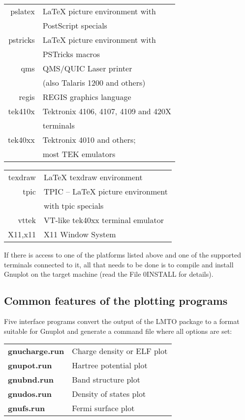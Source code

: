 \documentclass[aps,twocolumn,a4]{revtex4}
\begin{document}
\begin{tabular}{r l}
          pslatex & LaTeX picture environment with \\
                  & PostScript specials\\
         pstricks & LaTeX picture environment with \\
                  & PSTricks macros\\
              qms & QMS/QUIC Laser printer \\
                  & (also Talaris 1200 and others)\\
            regis & REGIS graphics language\\
          tek410x & Tektronix 4106, 4107, 4109 and 420X \\
                  & terminals\\
          tek40xx & Tektronix 4010 and others; \\
                  & most TEK emulators\\
\end{tabular}
\begin{tabular}{r l}
          texdraw & LaTeX texdraw environment\\
             tpic & TPIC -- LaTeX picture environment \\
                  & with tpic specials\\
            vttek & VT-like tek40xx terminal emulator\\
          X11,x11 & X11 Window System\\
\end{tabular}

If there is access to one of the platforms listed above and one of the
supported terminals connected to it, all that needs to be done is
to compile
and install Gnuplot on the target machine (read the File 0INSTALL for
details).

\subsection {Common features of the plotting programs}

Five interface programs convert the output of the LMTO package to a format
suitable for Gnuplot and generate a command file where all options are set:\\[5mm]

\begin{tabular}{ l l }
{\bf gnucharge.run} & Charge density or ELF plot\\
{\bf gnupot.run}    & Hartree potential plot\\
{\bf gnubnd.run}    & Band structure plot\\
{\bf gnudos.run}    & Density of states plot\\
{\bf gnufs.run}     & Fermi surface plot\\[5mm]
\end{tabular}
\end{document}
